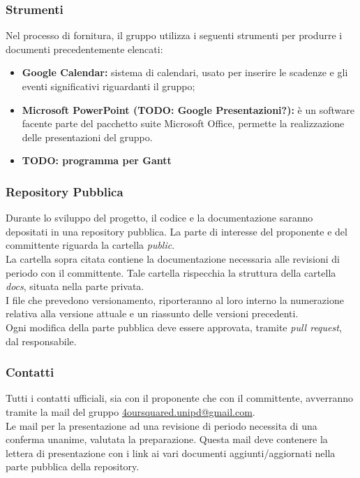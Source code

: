 \documentclass[a4paper, 12pt]{article}
\begin{document}
\subsubsection{Strumenti}
Nel processo di fornitura, il gruppo utilizza i seguenti strumenti per produrre
i documenti precedentemente elencati:
\begin{itemize}
    \item \textbf{Google Calendar:} sistema di calendari, usato per inserire le
    scadenze e gli eventi significativi riguardanti il gruppo;
    \item \textbf{Microsoft PowerPoint (TODO: Google Presentazioni?):} è un
    software facente parte del pacchetto suite Microsoft Office, permette la
    realizzazione delle presentazioni del gruppo.
    \item \textbf{TODO: programma per Gantt}
\end{itemize}

\subsubsection{Repository Pubblica}
Durante lo sviluppo del progetto, il codice e la documentazione saranno depositati in una repository pubblica. La parte di interesse del proponente e del committente riguarda la cartella \textit{public}. \\
La cartella sopra citata contiene la documentazione necessaria alle revisioni di periodo con il committente. Tale cartella rispecchia la struttura della cartella \textit{docs}, situata nella parte privata. \\
I file che prevedono versionamento, riporteranno al loro interno la numerazione relativa alla versione attuale e un riassunto delle versioni precedenti. \\ 
Ogni modifica della parte pubblica deve essere approvata, tramite \textit{pull request}, dal responsabile.

\subsubsection{Contatti}
Tutti i contatti ufficiali, sia con il proponente che con il committente, avverranno tramite la mail del gruppo \href{mailto:4oursquared.unipd@gmail.com}{4oursquared.unipd@gmail.com}.\\
Le mail per la presentazione ad una revisione di periodo necessita di una conferma unanime, valutata la preparazione. Questa mail deve contenere la lettera di presentazione con i link ai vari documenti aggiunti/aggiornati nella parte pubblica della repository.
\end{document}
